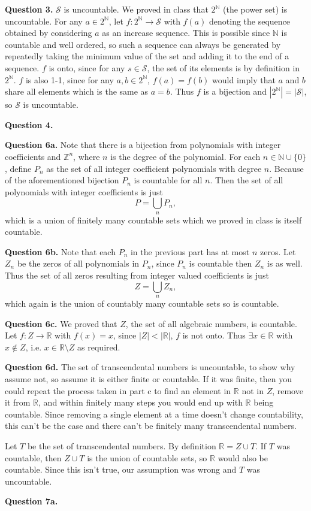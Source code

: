 \documentclass[letterpaper, reqno,11pt]{article}
\begin{document}
{\medskip\noindent\bf Question 3.} $\mathcal S$ is uncountable. We proved in class that $2^{\mathbb N}$ (the power set) is uncountable. For any $a\in 2^{\mathbb N}$, let $f:2^{\mathbb N}\to \mathcal S$ with $f(a)$ denoting the sequence obtained by considering $a$ as an increase sequence. This is possible since $\mathbb N$ is countable and well ordered, so such a sequence can always be generated by repeatedly taking the minimum value of the set and adding it to the end of a sequence. $f$ is onto, since for any $s\in\mathcal S$, the set of its elements is by definition in $2^{\mathbb N}$. $f$ is also 1-1, since for any $a, b\in 2^{\mathbb N}$, $f(a)=f(b)$ would imply that $a$ and $b$ share all elements which is the same as $a=b$. Thus $f$ is a bijection and $|2^{\mathbb N}|=|\mathcal S|$, so $\mathcal S$ is uncountable.

\newpage

{\medskip\noindent\bf Question 4.} 

\newpage

{\medskip\noindent\bf Question 6a.} Note that there is a bijection from polynomials with integer coefficients and $\mathbb{Z}^{n}$, where $n$ is the degree of the polynomial. For each $n\in \mathbb{N}\cup \{0\} $, define $P_n$ as the set of all integer coefficient polynomials with degree $n$. Because of the aforementioned bijection $P_n$ is countable for all $n$. Then the set of all polynomials with integer coefficients is just
\[
    P=\bigcup_{n} P_n
,\]
which is a union of finitely many countable sets which we proved in class is itself countable.

{\medskip\noindent\bf Question 6b.} Note that each $P_n$ in the previous part has at most $n$ zeros. Let $Z_n$ be the zeros of all polynomials in $P_n$, since $P_n$ is countable then $Z_n$ is as well. Thus the set of all zeros resulting from integer valued coefficients is just
\[
    Z=\bigcup_{n} Z_n
,\]
which again is the union of countably many countable sets so is countable.

{\medskip\noindent\bf Question 6c.} We proved that $Z$, the set of all algebraic numbers, is countable. Let $f:Z\to \mathbb{R}$ with $f(x)=x$, since $|Z|<|\mathbb{R}|$, $f$ is not onto. Thus $\exists x\in \mathbb{R}$ with $x\notin Z$, i.e. $x\in \mathbb{R}\setminus Z$ as required.

{\medskip\noindent\bf Question 6d.} The set of transcendental numbers is uncountable, to show why assume not, so assume it is either finite or countable. If it was finite, then you could repeat the process taken in part c to find an element in $\mathbb{R}$ not in $Z$, remove it from $\mathbb{R}$, and within finitely many steps you would end up with $\mathbb{R}$ being countable. Since removing a single element at a time doesn't change countability, this can't be the case and there can't be finitely many transcendental numbers.

Let $T$ be the set of transcendental numbers. By definition $\mathbb{R}=Z\cup T$. If $T$ was countable, then $Z\cup T$ is the union of countable sets, so $\mathbb{R}$ would also be countable. Since this isn't true, our assumption was wrong and $T$ was uncountable.

\newpage

{\medskip\noindent\bf Question 7a.} 
\end{document}
